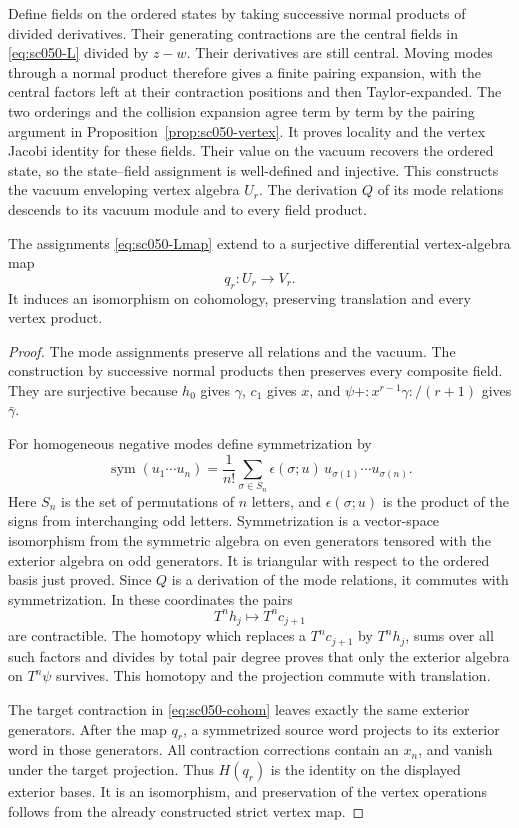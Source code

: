 Define fields on the ordered states by taking successive normal
products of divided derivatives. Their generating contractions are
the central fields in \eqref{eq:sc050-L} divided by \(z-w\).
Their derivatives are still central. Moving modes through a normal
product therefore gives a finite pairing expansion, with the central
factors left at their contraction positions and then Taylor-expanded.
The two orderings and the collision expansion agree term by term
by the pairing argument in Proposition~\ref{prop:sc050-vertex}.
It proves locality and the vertex Jacobi identity for these fields.
Their value on the vacuum recovers the ordered state, so the
state--field assignment is well-defined and injective.
This constructs the vacuum enveloping vertex algebra \(U_r\).
The derivation \(Q\) of its mode relations descends to its vacuum
module and to every field product.

\begin{theorem}\label{thm:sc050-vertex-resolution}
The assignments \eqref{eq:sc050-Lmap} extend to a surjective
differential vertex-algebra map
\[
 q_r:U_r\longrightarrow V_r.
\]
It induces an isomorphism on cohomology, preserving translation and
every vertex product.
\end{theorem}
\begin{proof}
The mode assignments preserve all relations and the vacuum. The
construction by successive normal products then preserves every
composite field. They are surjective because \(h_0\) gives
\(\gamma\), \(c_1\) gives \(x\), and
\(\psi+:x^{r-1}\gamma:/(r+1)\) gives \(\bar\gamma\).

For homogeneous negative modes define symmetrization by
\[
 \operatorname{sym}(u_1\cdots u_n)
   =\frac1{n!}\sum_{\sigma\in S_n}
        \epsilon(\sigma;u)\,u_{\sigma(1)}\cdots u_{\sigma(n)}.
\]
Here \(S_n\) is the set of permutations of \(n\) letters, and
\(\epsilon(\sigma;u)\) is the product of the signs from
interchanging odd letters. Symmetrization is a vector-space isomorphism
from the symmetric algebra on even generators tensored with the
exterior algebra on odd generators. It is triangular with respect
to the ordered basis just proved. Since \(Q\) is a derivation of
the mode relations, it commutes with symmetrization.
In these coordinates the pairs
\[
 T^nh_j\longmapsto T^nc_{j+1}
\]
are contractible. The homotopy which replaces a \(T^nc_{j+1}\) by
\(T^nh_j\), sums over all such factors and divides by total pair
degree proves that only the exterior algebra on \(T^n\psi\)
survives. This homotopy and the projection commute with translation.

The target contraction in \eqref{eq:sc050-cohom} leaves exactly the
same exterior generators. After the map \(q_r\), a symmetrized
source word projects to its exterior word in those generators.
All contraction corrections contain an \(x_n\), and vanish under
the target projection. Thus \(H(q_r)\) is the identity on the
displayed exterior bases. It is an isomorphism, and preservation
of the vertex operations follows from the already constructed
strict vertex map.
\end{proof}

